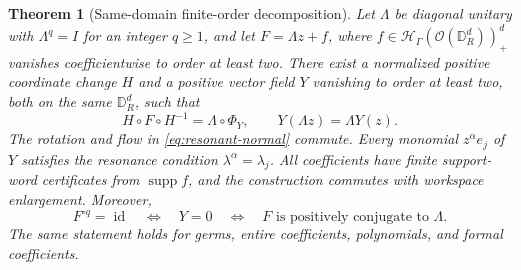 \documentclass[11pt,letterpaper]{article}
\newtheorem{theorem}{Theorem}[section]
\theoremstyle{definition}
\theoremstyle{remark}
\newcommand{\HH}{\mathscr H}
\newcommand{\OO}{\mathcal O}
\newcommand{\id}{\operatorname{id}}
\newcommand{\supp}{\operatorname{supp}}
\newcommand{\DR}{\mathbb D_R^d}
\numberwithin{equation}{section}
\begin{document}
\begin{theorem}[Same-domain finite-order decomposition]\label{thm:finite-order}
Let $\Lambda$ be diagonal unitary with $\Lambda^q=I$ for an integer $q\ge1$,
and let $F=\Lambda z+f$, where
$f\in\HH_\Gamma(\OO(\DR))_+^d$ vanishes coefficientwise to order at least
two. There exist a normalized positive coordinate change $H$ and a positive
vector field $Y$ vanishing to order at least two, both on the same $\DR$,
such that
\begin{equation}\label{eq:resonant-normal}
 H\circ F\circ H^{-1}=\Lambda\circ\Phi_Y,
 \qquad Y(\Lambda z)=\Lambda Y(z).
\end{equation}
The rotation and flow in \eqref{eq:resonant-normal} commute. Every monomial
$z^\alpha e_j$ of $Y$ satisfies the resonance condition
$\lambda^\alpha=\lambda_j$. All coefficients have finite support-word
certificates from $\supp f$, and the construction commutes with workspace
enlargement. Moreover,
\begin{equation}\label{eq:finiteorder-equivalence}
 F^{\circ q}=\id
 \quad\Longleftrightarrow\quad Y=0
 \quad\Longleftrightarrow\quad
 F\text{ is positively conjugate to }\Lambda.
\end{equation}
The same statement holds for germs, entire coefficients, polynomials, and
formal coefficients.
\end{theorem}
\end{document}
